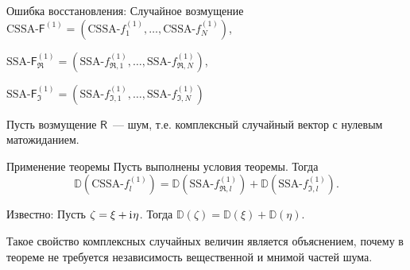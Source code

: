 \documentclass[ucs, notheorems, handout]{beamer}
\newcommand{\tX}[1]{\mathsf{#1}}
\newcommand{\iu}{\mathrm{i}\mkern1mu}
\begin{document}
\begin{frame}{Ошибка восстановления: Случайное возмущение}
$\text{CSSA-}\tX{F}^{(1)} = (\text{CSSA-}f^{(1)}_1, \ldots, \text{CSSA-}f^{(1)}_N)$,

$\text{SSA-}\tX{F}^{(1)}_{\Re} = (\text{SSA-}f^{(1)}_{\Re, 1}, \ldots, \text{SSA-}f^{(1)}_{\Re, N})$,

$\text{SSA-}\tX{F}^{(1)}_{\Im} = (\text{SSA-}f^{(1)}_{\Im, 1}, \ldots, \text{SSA-}f^{(1)}_{\Im, N})$\\
\vspace{1em}

Пусть возмущение $\tX{R}$~--- шум, т.е. комплексный случайный вектор с нулевым матожиданием.\\
\vspace{1em}
\begin{block}{Применение теоремы}
Пусть выполнены условия теоремы.
Тогда
\begin{equation*} \label{eq:dispsum}
\mathbb{D}(\text{CSSA-}f^{(1)}_l) = \mathbb{D}(\text{SSA-}f^{(1)}_{\Re, l}) + \mathbb{D}(\text{SSA-}f^{(1)}_{\Im, l}).	
\end{equation*}
\end{block}

\alert{Известно:} Пусть $\zeta = \xi + \iu\eta$. Тогда $\mathbb{D}(\zeta) = \mathbb{D}(\xi) + \mathbb{D}(\eta)$.

Такое свойство комплексных случайных величин является объяснением, почему в теореме не требуется независимость вещественной и мнимой частей шума.
\end{frame}
\end{document}
